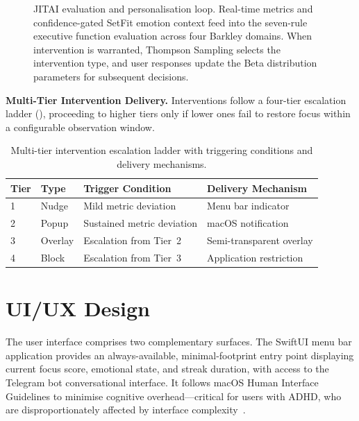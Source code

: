 \begin{figure}[htbp]
  \caption{JITAI evaluation and personalisation loop. Real-time metrics and confidence-gated SetFit emotion context feed into the seven-rule executive function evaluation across four Barkley domains. When intervention is warranted, Thompson Sampling selects the intervention type, and user responses update the Beta distribution parameters for subsequent decisions.}
  \label{fig:jitai_loop}
\end{figure}

\textbf{Multi-Tier Intervention Delivery.} Interventions follow a four-tier escalation ladder (), proceeding to higher tiers only if lower ones fail to restore focus within a configurable observation window.

\begin{table}[htbp]
  \centering
  \caption{Multi-tier intervention escalation ladder with triggering conditions and delivery mechanisms.}
  \label{tab:intervention_tiers}
  \begin{tabular}{llll}
    \toprule
    \textbf{Tier} & \textbf{Type} & \textbf{Trigger Condition} & \textbf{Delivery Mechanism} \\
    \midrule
    1 & Nudge   & Mild metric deviation       & Menu bar indicator \\
    2 & Popup   & Sustained metric deviation   & macOS notification \\
    3 & Overlay & Escalation from Tier~2       & Semi-transparent overlay \\
    4 & Block   & Escalation from Tier~3       & Application restriction \\
    \bottomrule
  \end{tabular}
\end{table}


\section{UI/UX Design}
\label{sec:uiux_design}

The user interface comprises two complementary surfaces. The SwiftUI menu bar application provides an always-available, minimal-footprint entry point displaying current focus score, emotional state, and streak duration, with access to the Telegram bot conversational interface. It follows macOS Human Interface Guidelines to minimise cognitive overhead---critical for users with ADHD, who are disproportionately affected by interface complexity~\cite{beattie2025}.

